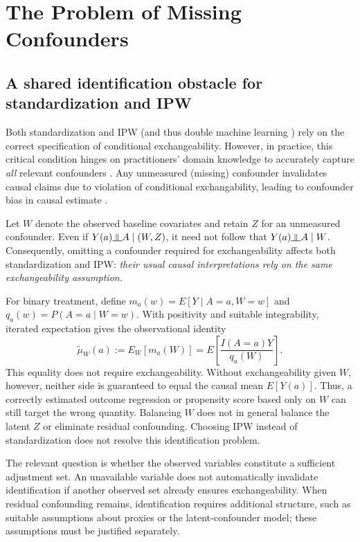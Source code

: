 \documentclass[11pt,twoside]{article}
\begin{document}
\section{The Problem of Missing Confounders}
\label{sec:missing-confounders}

\subsection{A shared identification obstacle for standardization and IPW}

Both standardization and IPW (and thus double machine learning \cite{bach2024doubleml}) rely on the correct specification of conditional exchangeability. However, in practice, this critical condition hinges on practitioners' domain knowledge to accurately capture \emph{all} relevant confounders \cite{tchetgen2020introduction}. Any unmeasured (missing) confounder invalidates causal claims due to violation of conditional exchangability, leading to confounder bias in causal estimate \cite{tchetgen2014control}.

Let $W$ denote the observed baseline covariates and retain $Z$ for an unmeasured confounder. Even if $Y(a)\indep A\mid(W,Z)$, it need not follow that $Y(a)\indep A\mid W$. Consequently, omitting a confounder required for exchangeability affects both standardization and IPW: \emph{their usual causal interpretations rely on the same exchangeability assumption.} 

For binary treatment, define $m_a(w)=E[Y\mid A=a,W=w]$ and $q_a(w)=P(A=a\mid W=w)$. With positivity and suitable integrability, iterated expectation gives the observational identity
\begin{equation}
\label{eq:observed-adjustment-functional}
 \widetilde\mu_W(a)
 :=E_W[m_a(W)]
 =E\!\left[\frac{I(A=a)Y}{q_a(W)}\right].
\end{equation}
This equality does not require exchangeability. Without exchangeability given $W$, however, neither side is guaranteed to equal the causal mean $E[Y(a)]$. Thus, a correctly estimated outcome regression or propensity score based only on $W$ can still target the wrong quantity. Balancing $W$ does not in general balance the latent $Z$ or eliminate residual confounding. Choosing IPW instead of standardization does not resolve this identification problem.

The relevant question is whether the observed variables constitute a sufficient adjustment set. An unavailable variable does not automatically invalidate identification if another observed set already ensures exchangeability. When residual confounding remains, identification requires additional structure, such as suitable assumptions about proxies or the latent-confounder model; these assumptions must be justified separately.
\end{document}
